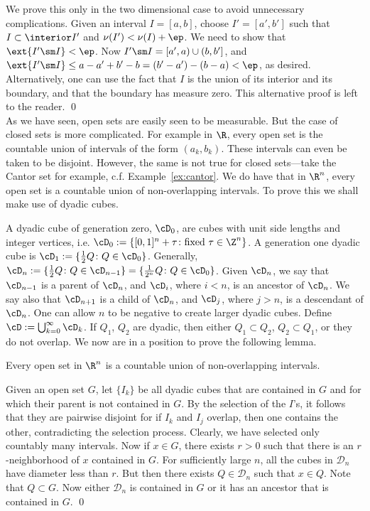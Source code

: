 \pfsk We prove this only in the two dimensional case to avoid unnecessary complications. Given an interval $I=[a,b]$, choose $I'=[a',b']$ such that $I \subset \interior I'$ and $\nu(I')< \nu(I)+\ep$. We need to show that $\ext{I' \sm I}<\ep$. Now $I' \sm I=[a',a) \cup (b,b']$, and $\ext{I' \sm I} \leq a-a'+b'-b= (b'-a') - (b-a)<\ep$, as desired. Alternatively, one can use the fact that $I$ is the union of its interior and its boundary, and that the boundary has measure zero. This alternative proof is left to the reader. \qed \\


As we have seen, open sets are easily seen to be measurable. But the case of closed sets is more complicated. For example in $\R$, every open set is the countable union of intervals of the form $(a_k,b_k)$. These intervals can even be taken to be disjoint. However, the same is not true for closed sets---take the Cantor set for example, c.f. Example~\ref{ex:cantor}. We do have that in $\R^n$, every open set is a countable union of non-overlapping intervals. To prove this we shall make use of dyadic cubes.


A dyadic cube of generation zero, $\cD_0$, are cubes with unit side lengths and integer vertices, i.e. $\cD_0:=\{[0,1]^n + \tau \colon \text{fixed } \tau \in \Z^n\}$. A generation one dyadic cube is $\cD_1:= \{\frac{1}{2}Q \colon Q \in \cD_0\}$. Generally, $\cD_n:= \{\frac{1}{2} Q \colon Q \in \cD_{n-1}\}=\{\frac{1}{2^n}Q \colon Q \in \cD_0\}$. Given $\cD_n$, we say that $\cD_{n-1}$ is a parent of $\cD_n$, and $\cD_i$, where $i<n$, is an ancestor of $\cD_n$. We say also that $\cD_{n+1}$ is a child of $\cD_n$, and $\cD_j$, where $j>n$, is a descendant of $\cD_n$. One can allow $n$ to be negative to create larger dyadic cubes. Define $\cD:= \bigcup_{k=0}^\infty \cD_k$. If $Q_1$, $Q_2$ are dyadic, then either $Q_1 \subset Q_2$, $Q_2 \subset Q_1$, or they do not overlap. We now are in a position to prove the following lemma. 


\begin{lem} \label{lem:tiling}
Every open set in $\R^n$ is a countable union of non-overlapping intervals. 
\end{lem}

\pf Given an open set $G$, let $\{I_k\}$ be all dyadic cubes that are contained in $G$ and for which their parent is not contained in $G$. By the selection of the $I$'s, it follows that they are pairwise disjoint for if $I_k$ and $I_j$ overlap, then one contains the other, contradicting the selection process. Clearly, we have selected only countably many intervals. Now if $x \in G$, there exists $r>0$ such that there is an $r$-neighborhood of $x$ contained in $G$. For sufficiently large $n$, all the cubes in $\mathcal{D}_n$ have diameter less than $r$. But then there exists $Q \in \mathcal{D}_n$ such that $x \in Q$. Note that $Q \subset G$. Now either $\mathcal{D}_n$ is contained in $G$ or it has an ancestor that is contained in $G$. \qed \\


